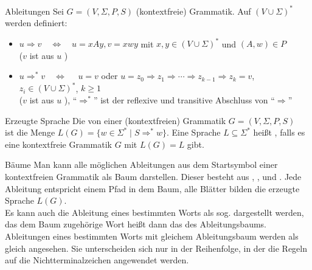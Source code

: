 \begin{Def}{Ableitungen}
    Sei $G = (V, \Sigma, P, S)$ (kontextfreie) Grammatik. Auf
    $(V \cup \Sigma)^\ast$ werden definiert:
    \begin{itemize}
        \item $u \Rightarrow v \quad\Leftrightarrow\quad u = xAy, v = xwy$ mit
        $x, y \in (V \cup \Sigma)^\ast$ und $(A, w) \in P$ \\
        ($v$ ist aus $u$ )

        \item $u \Rightarrow^\ast v \quad\Leftrightarrow\quad$
        $u = v$ oder
        $u = z_0 \Rightarrow z_1 \Rightarrow \cdots \Rightarrow z_{k-1}
        \Rightarrow z_k = v$, $z_i \in (V \cup \Sigma)^\ast$, $k \ge 1$ \\
        ($v$ ist aus $u$ ),
        "`$\Rightarrow^\ast$"' ist der reflexive und transitive Abschluss
        von "`$\Rightarrow$"'
    \end{itemize}
\end{Def}

\begin{Def}{Erzeugte Sprache}
    Die von einer (kontextfreien) Grammatik $G = (V, \Sigma, P, S)$ \\
     ist die Menge
    $L(G) = \{w \in \Sigma^\ast \;|\; S \Rightarrow^\ast w\}$.
    Eine Sprache $L \subseteq \Sigma^\ast$ heißt
    , falls es eine kontextfreie Grammatik $G$
    mit $L(G) = L$ gibt.
\end{Def}

\begin{Def}{Bäume}
    Man kann alle möglichen Ableitungen aus dem Startsymbol einer kontextfreien
    Grammatik als Baum darstellen.
    Dieser besteht aus , , 
    und .
    Jede Ableitung entspricht einem Pfad in dem Baum, alle Blätter bilden
    die erzeugte Sprache $L(G)$. \\
    Es kann auch die Ableitung eines bestimmten Worts als sog.
     dargestellt werden, das dem Baum zugehörige Wort
    heißt dann das  des Ableitungsbaums. \\
    Ableitungen eines bestimmten Worts mit gleichem Ableitungsbaum werden als
    gleich angesehen.
    Sie unterscheiden sich nur in der Reihenfolge, in der die Regeln auf die
    Nichtterminalzeichen angewendet werden.
\end{Def}

